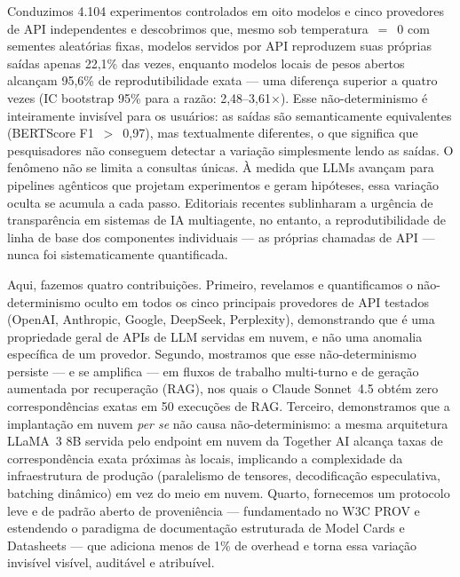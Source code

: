 \documentclass[12pt,a4paper]{article}
\begin{document}
Conduzimos 4.104 experimentos controlados em oito modelos e cinco provedores de API independentes e descobrimos que, mesmo sob temperatura~$=$~0 com sementes aleatórias fixas, modelos servidos por API reproduzem suas próprias saídas apenas 22,1\% das vezes, enquanto modelos locais de pesos abertos alcançam 95,6\% de reprodutibilidade exata --- uma diferença superior a quatro vezes (IC bootstrap 95\% para a razão: 2,48--3,61$\times$).
Esse não-determinismo é inteiramente invisível para os usuários: as saídas são semanticamente equivalentes (BERTScore F1~$>$~0,97), mas textualmente diferentes, o que significa que pesquisadores não conseguem detectar a variação simplesmente lendo as saídas.
O fenômeno não se limita a consultas únicas.
À medida que LLMs avançam para pipelines agênticos que projetam experimentos e geram hipóteses, essa variação oculta se acumula a cada passo.
Editoriais recentes sublinharam a urgência de transparência em sistemas de IA multiagente, no entanto, a reprodutibilidade de linha de base dos componentes individuais --- as próprias chamadas de API --- nunca foi sistematicamente quantificada.

Aqui, fazemos quatro contribuições.
Primeiro, revelamos e quantificamos o não-determinismo oculto em todos os cinco principais provedores de API testados (OpenAI, Anthropic, Google, DeepSeek, Perplexity), demonstrando que é uma propriedade geral de APIs de LLM servidas em nuvem, e não uma anomalia específica de um provedor.
Segundo, mostramos que esse não-determinismo persiste --- e se amplifica --- em fluxos de trabalho multi-turno e de geração aumentada por recuperação (RAG), nos quais o Claude Sonnet~4.5 obtém zero correspondências exatas em 50 execuções de RAG.
Terceiro, demonstramos que a implantação em nuvem \emph{per se} não causa não-determinismo: a mesma arquitetura LLaMA~3 8B servida pelo endpoint em nuvem da Together AI alcança taxas de correspondência exata próximas às locais, implicando a complexidade da infraestrutura de produção (paralelismo de tensores, decodificação especulativa, batching dinâmico) em vez do meio em nuvem.
Quarto, fornecemos um protocolo leve e de padrão aberto de proveniência --- fundamentado no W3C PROV e estendendo o paradigma de documentação estruturada de Model Cards e Datasheets --- que adiciona menos de 1\% de overhead e torna essa variação invisível visível, auditável e atribuível.


\end{document}
